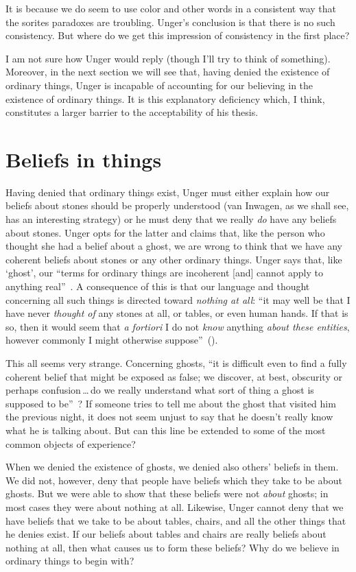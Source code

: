 \documentclass[11pt]{standalone} \newif\ifstandlone \standalonetrue
\begin{document}
\begin{spacing}{1.5}
It is because we do seem to use color and other words in a consistent
way that the sorites paradoxes are troubling.  Unger's conclusion is
that there is no such consistency.  But where do we get this
impression of consistency in the first place?

I am not sure how Unger would reply (though I'll try to think of
something).  Moreover, in the next section we will see that, having
denied the existence of ordinary things, Unger is incapable of
accounting for our believing in the existence of ordinary things.  It
is this explanatory deficiency which, I think, constitutes a larger
barrier to the acceptability of his thesis.

\section{Beliefs in things}
\label{beliefs}
Having denied that ordinary things exist, Unger must either explain
how our beliefs about stones should be properly understood (van
Inwagen, as we shall see, has an interesting strategy) or he must deny
that we really {\em do} have any beliefs about stones.  Unger opts for
the latter and claims that, like the person who thought she had a
belief about a ghost, we are wrong to think that we have any coherent
beliefs about stones or any other ordinary things.  Unger says that,
like `ghost', our ``terms for ordinary things are incoherent [and]
cannot apply to anything real''~\citep[147]{unger1979}.  A consequence
of this is that our language and thought concerning all such things is
directed toward {\em nothing at all}: ``it may well be that I have
never {\em thought of} any stones at all, or tables, or even human
hands.  If that is so, then it would seem that {\em a fortiori} I do
not {\em know} anything {\em about these entities}, however commonly I
might otherwise suppose''~(\citeyear[458]{unger1980a}).

This all seems very strange.  Concerning ghosts, ``it is difficult
even to find a fully coherent belief that might be exposed as false;
we discover, at best, obscurity or perhaps confusion\,\ldots\,do we
really understand what sort of thing a ghost is supposed to
be''~\citep[76]{stroud2000a}?  If someone tries to tell me about the
ghost that visited him the previous night, it does not seem unjust to
say that he doesn't really know what he is talking about.  But can
this line be extended to some of the most common objects of
experience?

When we denied the existence of ghosts, we denied also others' beliefs
in them.  We did not, however, deny that people have beliefs which
they take to be about ghosts.  But we were able to show that these
beliefs were not {\em about} ghosts; in most cases they were about
nothing at all.  Likewise, Unger cannot deny that we have beliefs that
we take to be about tables, chairs, and all the other things that he
denies exist.  If our beliefs about tables and chairs are really
beliefs about nothing at all, then what causes us to form these
beliefs?  Why do we believe in ordinary things to begin with?


\end{spacing}
\end{document}
